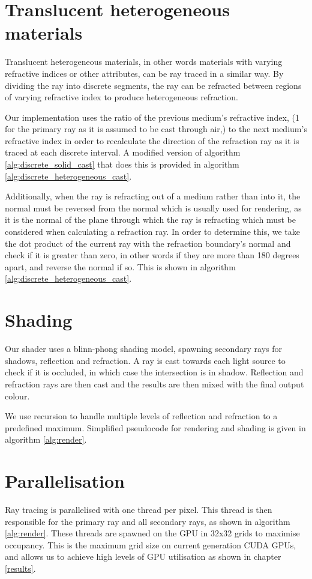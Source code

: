 \section{Translucent heterogeneous materials}
Translucent heterogeneous materials, in other words materials with varying refractive indices or other attributes, can be ray traced in a similar way. By dividing the ray into discrete segments, the ray can be refracted between regions of varying refractive index to produce heterogeneous refraction.

Our implementation uses the ratio of the previous medium's refractive index, (1 for the primary ray as it is assumed to be cast through air,) to the next medium's refractive index in order to recalculate the direction of the refraction ray as it is traced at each discrete interval. A modified version of algorithm \ref{alg:discrete_solid_cast} that does this is provided in algorithm \ref{alg:discrete_heterogeneous_cast}.

Additionally, when the ray is refracting out of a medium rather than into it, the normal must be reversed from the normal which is usually used for rendering, as it is the normal of the plane through which the ray is refracting which must be considered when calculating a refraction ray. In order to determine this, we take the dot product of the current ray with the refraction boundary's normal and check if it is greater than zero, in other words if they are more than 180 degrees apart, and reverse the normal if so. This is shown in algorithm \ref{alg:discrete_heterogeneous_cast}.

\section{Shading}
Our shader uses a blinn-phong shading model, spawning secondary rays for shadows, reflection and refraction. A ray is cast towards each light source to check if it is occluded, in which case the intersection is in shadow. Reflection and refraction rays are then cast and the results are then mixed with the final output colour.

We use recursion to handle multiple levels of reflection and refraction to a predefined maximum. Simplified pseudocode for rendering and shading is given in algorithm \ref{alg:render}.

\section{Parallelisation}
Ray tracing is parallelised with one thread per pixel. This thread is then responsible for the primary ray and all secondary rays, as shown in algorithm \ref{alg:render}. These threads are spawned on the GPU in 32x32 grids to maximise occupancy. This is the maximum grid size on current generation CUDA GPUs, and allows us to achieve high levels of GPU utilisation as shown in chapter \ref{results}.


